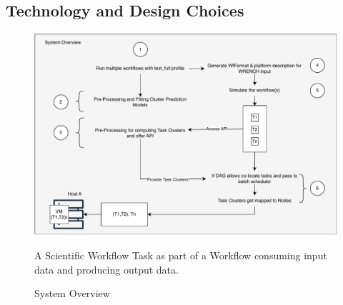 \subsection{Technology and Design Choices}
\label{sec:technology_and_design_choices}
\begin{figure}[H]
    \centering
    \includegraphics[scale=0.7]{fig/05/05-system-overview.pdf}
    \caption{System Overview}
    \small
    \label{fig:05-system-overview}
    \tiny
    A Scientific Workflow Task as part of a Workflow consuming input data and producing output data.
\end{figure}
